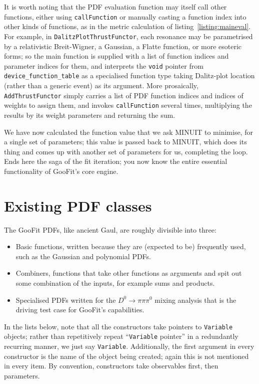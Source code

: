 \documentclass[12pt,pdflatex]{article}
\begin{document}
It is worth noting that the PDF evaluation function may itself call other functions,
either using \verb|callFunction| or manually casting a function index into other
kinds of functions, as in the metric calculation of listing~\ref{listing:maineval}.
For example, in \verb|DalitzPlotThrustFunctor|, each resonance may be parametrised
by a relativistic Breit-Wigner, a Gaussian, a Flatte function, or more esoteric forms;
so the main function is supplied with a list of function indices and parameter indices
for them, and interprets the \verb|void| pointer from \verb|device_function_table| as a specialised
function type taking Dalitz-plot location (rather than a generic event) as its argument. 
More prosaically, \verb|AddThrustFunctor| simply carries a list of PDF function indices
and indices of weights to assign them, and invokes \verb|callFunction| several times,
multiplying the results by its weight parameters and returning the sum. 

We have now calculated the function value that we ask MINUIT to minimise, for 
a single set of parameters; this value is passed back to MINUIT, which does its
thing and comes up with another set of parameters for us, completing the loop. 
Ends here the saga of the fit iteration; you now know the entire essential
functionality of GooFit's core engine. 

\section{Existing PDF classes}

The GooFit PDFs, like ancient Gaul, are roughly divisible into three:
\begin{itemize}
\item Basic functions, written because they are (expected to be) frequently used,
such as the Gaussian and polynomial PDFs.
\item Combiners, functions that take other functions as arguments and
spit out some combination of the inputs, for example sums and products.
\item Specialised PDFs written for the $D^0\to\pi\pi\pi^0$ mixing analysis
that is the driving test case for GooFit's capabilities. 
\end{itemize}

In the lists below, note that all the constructors
take pointers to \texttt{Variable} objects; rather than 
repetitively repeat ``\texttt{Variable} pointer''
in a redundantly recurring manner, we just say \texttt{Variable}. 
Additionally, the first argument in every constructor is the name
of the object being created; again this is not mentioned in every
item. By convention, constructors take observables first, then parameters. 
\end{document}
